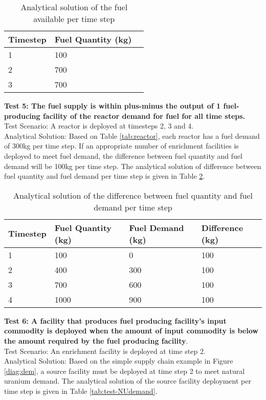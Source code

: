 \documentclass[12pt,letterpaper]{article}
\begin{document}
\begin{table}[H]
     \centering
    \begin{tabularx}{\textwidth}{bbb}
       \hline
       Timestep & Fuel Quantity (kg)  \\
       \hline
       1 & 100 \\
       2 & 700 \\
       3 & 700\\
       \hline
    \end{tabularx}
    \caption {Analytical solution of the fuel available per time step}
    \label{tab:test-fueldemand}
\end{table}

\noindent
\textbf{Test 5: The fuel supply is within plus-minus the output of 1 fuel-producing facility of the reactor demand for fuel for all time steps.} \\
Test Scenario: A reactor is deployed at timesteps 2, 3 and 4.\\
Analytical Solution: Based on Table \ref{tab:reactor}, each reactor has a fuel demand of 300kg per time step. If an appropriate number of enrichment facilities is deployed to meet fuel demand, the difference between fuel quantity and fuel demand will be 100kg per time step. The analytical solution of difference between fuel quantity and fuel demand per time step is given in Table \ref{tab:test-fueldiff}.  

\begin{table}[H]
     \centering
    \begin{tabularx}{\textwidth}{bbbb}
       \hline
       Timestep & Fuel Quantity (kg) & Fuel Demand (kg) & Difference (kg)\\
       \hline
       1 & 100 & 0 &100\\
       2 & 400 & 300 &100\\
       3 & 700 & 600 &100\\
       4 & 1000 & 900 &100\\
       \hline
    \end{tabularx}
    \caption {Analytical solution of the difference between fuel quantity and fuel demand per time step}
    \label{tab:test-fueldiff}
\end{table}

\noindent
\textbf{Test 6: A facility that produces fuel producing facility's input commodity is deployed when the amount of input commodity is below the amount required by the fuel producing facility}. \\
Test Scenario: An enrichment facility is deployed at time step 2. \\
Analytical Solution: Based on the simple supply chain example in Figure \ref{diag:dem}, a source facility must be deployed at time step 2 to meet natural uranium demand. The analytical solution of the source facility deployment per time step is given in Table \ref{tab:test-NUdemand}. 
\end{document}
